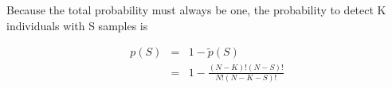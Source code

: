 Because the total probability must always be one, the probability
to detect K individuals with S samples is

\begin{eqnarray}
p(S) & = & 1 -\tilde{p}(S)\\
     & = & 1 - \frac{(N-K)! (N-S)!}{N! (N-K-S)!}
\end{eqnarray}













